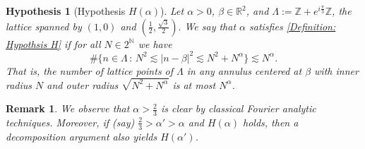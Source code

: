 \documentclass[12pt, letterpaper]{amsart}
\newtheorem{remark}{Remark}
\newtheorem{hypothesis}{Hypothesis}
\begin{document}
\begin{hypothesis}[Hypothesis $H(\alpha)$]
    Let $\alpha > 0$, $\beta\in \mathbb{R}^2$, and $\Lambda:= \mathbb{Z} + e^{i\frac{\pi}{3}}\mathbb{Z}$, the lattice spanned by $(1,0)$ and $(\frac{1}{2}, \frac{\sqrt{3}}{2}).$ We say that $\alpha$ satisfies \ref{Definition: Hypothsis H} if for all $N\in 2^\mathbb{N}$ we have
    \begin{equation}\tag{$H(\alpha)$}\label{Definition: Hypothsis H}
        \#\{n\in \Lambda\,:\,N^2\lesssim |n-\beta|^2\lesssim N^2+N^\alpha\}\lesssim N^\alpha.
    \end{equation}
    That is, the number of lattice points of $\Lambda$ in any annulus centered at $\beta$ with inner radius $N$ and outer radius $\sqrt{N^2+N^\alpha}$ is at most $N^\alpha$.    
\end{hypothesis}
\begin{remark}\label{Remark: H holds for larger}
    We observe that $\alpha > \frac23$ is clear by classical Fourier analytic techniques. Moreover, if (say) $\frac23 > \alpha' > \alpha$ and $H(\alpha)$ holds, then a decomposition argument also yields $H(\alpha')$.
\end{remark}
\end{document}
